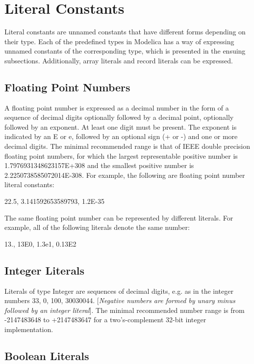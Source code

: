\documentclass[10pt,a4paper]{report}
\def\doublelabel#1{\label{#1}\hypertarget{#1}{}}
\begin{document}
\section{Literal Constants}\doublelabel{literal-constants}

Literal constants are unnamed constants that have different forms
depending on their type. Each of the predefined types in Modelica has a
way of expressing unnamed constants of the corresponding type, which is
presented in the ensuing subsections. Additionally, array literals and
record literals can be expressed.

\subsection{Floating Point Numbers}\doublelabel{floating-point-numbers}

A floating point number is expressed as a decimal number in the form of
a sequence of decimal digits optionally followed by a decimal point,
optionally followed by an exponent. At least one digit must be present.
The exponent is indicated by an E or e, followed by an optional sign (+
or -) and one or more decimal digits. The minimal recommended range is
that of IEEE double precision floating point numbers, for which the
largest representable positive number is 1.7976931348623157E+308 and the
smallest positive number is 2.2250738585072014E-308. For example, the
following are floating point number literal constants:

22.5, 3.141592653589793, 1.2E-35

The same floating point number can be represented by different literals.
For example, all of the following literals denote the same number:

13., 13E0, 1.3e1, 0.13E2

\subsection{Integer Literals}\doublelabel{integer-literals}

Literals of type Integer are sequences of decimal digits, e.g. as in the
integer numbers 33, 0, 100, 30030044. {[}\emph{Negative numbers are
formed by unary minus followed by an integer literal}{]}. The minimal
recommended number range is from -2147483648 to +2147483647 for a
two's-complement 32-bit integer implementation.

\subsection{Boolean Literals}\doublelabel{boolean-literals}
\end{document}
